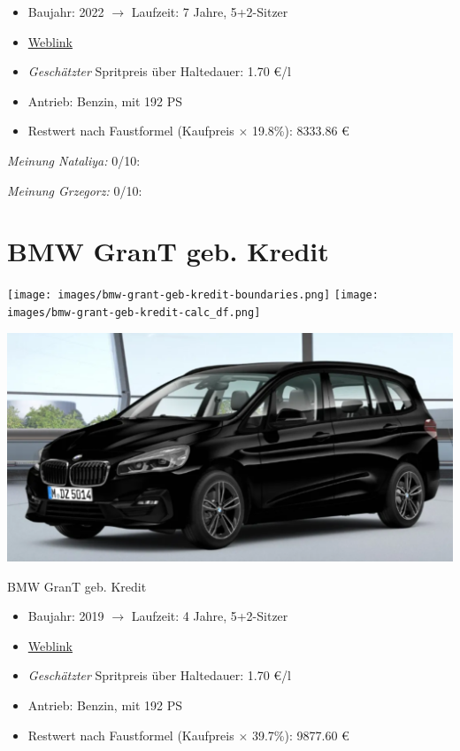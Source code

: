 \documentclass[landscape, DIV=99, 14pt]{scrartcl}
\begin{document}
\begin{itemize}
    \item Baujahr: 2022 $\rightarrow$ Laufzeit: 7 Jahre, 5+2-Sitzer
    \item \href{https://mulfinger.de/de/fahrzeugangebot/BMW/220i-GranTourer-Sport-DKG-HUD-LED-ParkAssNavi/page1/details-p5clkem9?manufacturer=5&model=2534&view=list}{Weblink}
    \item \emph{Gesch\"atzter} Spritpreis \"uber Haltedauer: 1.70 \euro{}/l
    \item Antrieb: Benzin, mit 192 PS
    \item Restwert nach Faustformel (Kaufpreis $\times$ 19.8\%): 8333.86 \euro{}
\end{itemize}

\begin{small}
\emph{Meinung Nataliya:} 0/10: 
        
\emph{Meinung Grzegorz:} 0/10: 
\end{small}

\pagebreak


\twocolumn

\section*{BMW GranT geb. Kredit}
\begin{center}
\texttt{[image: images/bmw-grant-geb-kredit-boundaries.png]}
\null
\vspace{0.5cm}
\texttt{[image: images/bmw-grant-geb-kredit-calc\_df.png]}
\end{center}

\pagebreak
\begin{center}
\includegraphics[width=0.9\columnwidth]{cars/bmw-gran-tourer-mulfinger.png}

BMW GranT geb. Kredit
\end{center}

\begin{itemize}
    \item Baujahr: 2019 $\rightarrow$ Laufzeit: 4 Jahre, 5+2-Sitzer
    \item \href{https://mulfinger.de/de/fahrzeugangebot/BMW/220i-GranTourer-Sport-DKG-HUD-LED-ParkAssNavi/page1/details-p5clkem9?manufacturer=5&model=2534&view=list}{Weblink}
    \item \emph{Gesch\"atzter} Spritpreis \"uber Haltedauer: 1.70 \euro{}/l
    \item Antrieb: Benzin, mit 192 PS
    \item Restwert nach Faustformel (Kaufpreis $\times$ 39.7\%): 9877.60 \euro{}
\end{itemize}
\end{document}
